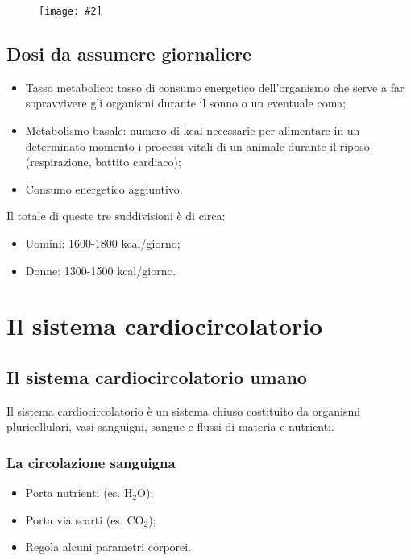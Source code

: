 \documentclass{article}
\newcommand{\cfig}[2]{
    \phantom{}
    \begin{figure}[ht!]
        \begin{center}
            \texttt{[image: \#2]}
        \end{center}
    \end{figure}
}
\begin{document}
\cfig{.8}{media/digestione.png}

\newpage
\subsection{Dosi da assumere giornaliere}
\begin{itemize}
    \item Tasso metabolico: tasso di consumo energetico dell'organismo che serve a far
        sopravvivere gli organismi durante il sonno o un eventuale coma;
    \item Metabolismo basale: numero di kcal necessarie per alimentare in un determinato
        momento i processi vitali di un animale durante il riposo (respirazione, battito
        cardiaco);
    \item Consumo energetico aggiuntivo.
\end{itemize}

Il totale di queste tre suddivisioni è di circa:
\begin{itemize}
    \item Uomini: 1600-1800 kcal/giorno;
    \item Donne: 1300-1500 kcal/giorno.
\end{itemize}

\newpage
\section{Il sistema cardiocircolatorio}
\subsection{Il sistema cardiocircolatorio umano}
Il sistema cardiocircolatorio è un sistema chiuso costituito da organismi pluricellulari,
vasi sanguigni, sangue e flussi di materia e nutrienti.

\subsubsection{La circolazione sanguigna}
{}
\begin{itemize}
    \item Porta nutrienti (es. H$_2$O);
    \item Porta via scarti (es. CO$_2$);
    \item Regola alcuni parametri corporei.
\end{itemize}
\end{document}
